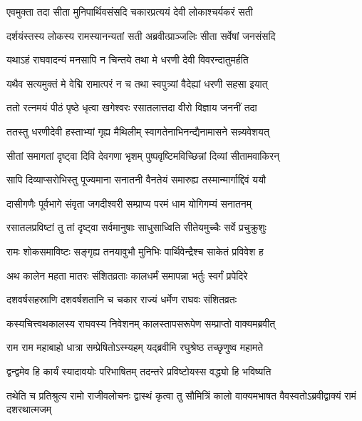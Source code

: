 
\twolineshloka
{एवमुक्ता तदा सीता मुनिपार्थिवसंसदि}
{चकारप्रत्ययं देवी लोकाश्चर्यकरं सती}%

\twolineshloka
{दर्शयंस्तस्य लोकस्य रामस्यानन्यतां सती}
{अब्रवीत्प्राञ्जलिः सीता सर्वेषां जनसंसदि}%


\twolineshloka
{यथाऽहं राघवादन्यं मनसापि न चिन्तये}
{तथा मे धरणी देवी विवरन्दातुमर्हति}%

\twolineshloka
{यथैव सत्यमुक्तं मे वेद्मि रामात्परं न च}
{तथा स्वपुत्र्यां वैदेह्यां धरणी सहसा इयात्}%


\twolineshloka
{ततो रत्नमयं पीठं पृष्ठे धृत्वा खगेश्वरः}
{रसातलात्तदा वीरो विज्ञाय जननीं तदा}%

\twolineshloka
{ततस्तु धरणीदेवी हस्ताभ्यां गृह्य मैथिलीम्}
{स्वागतेनाभिनन्द्यैनामासने सन्न्यवेशयत्}%

\twolineshloka
{सीतां समागतां दृष्ट्वा दिवि देवगणा भृशम्}
{पुष्पवृष्टिमविच्छिन्नां दिव्यां सीतामवाकिरन्}%

\twolineshloka
{सापि दिव्याप्सरोभिस्तु पूज्यमाना सनातनी}
{वैनतेयं समारुह्य तस्मान्मार्गाद्दिवं ययौ}%

\twolineshloka
{दासीगणैः पूर्वभागे संवृता जगदीश्वरी}
{सम्प्राप्य परमं धाम योगिगम्यं सनातनम्}%

\twolineshloka
{रसातलप्रविष्टां तु तां दृष्ट्वा सर्वमानुषाः}
{साधुसाध्विति सीतेयमुच्चैः सर्वे प्रचुक्रुशुः}%

\twolineshloka
{रामः शोकसमाविष्टः सङ्गृह्य तनयावुभौ}
{मुनिभिः पार्थिवेन्द्रैश्च साकेतं प्रविवेश ह}%

\twolineshloka
{अथ कालेन महता मातरः संशितव्रताः}
{कालधर्मं समापन्ना भर्तुः स्वर्गं प्रपेदिरे}%

\twolineshloka
{दशवर्षसहस्राणि दशवर्षशतानि च}
{चकार राज्यं धर्मेण राघवः संशितव्रतः}%

\twolineshloka
{कस्यचित्त्वथकालस्य राघवस्य निवेशनम्}
{कालस्तापसरूपेण सम्प्राप्तो वाक्यमब्रवीत्}%


\twolineshloka
{राम राम महाबाहो धात्रा सम्प्रेषितोऽस्म्यहम्}
{यद्ब्रवीमि रघुश्रेष्ठ तच्छृणुष्व महामते}%

\twolineshloka
{द्वन्द्वमेव हि कार्यं स्यादावयोः परिभाषितम्}
{तदन्तरे प्रविष्टोयस्स वद्ध्यो हि भविष्यति}%



\threelineshloka
{तथेति च प्रतिश्रुत्य रामो राजीवलोचनः}
{द्वास्थं कृत्वा तु सौमित्रिं कालो वाक्यमभाषत}
{वैवस्वतोऽब्रवीद्वाक्यं रामं दशरथात्मजम्}%

